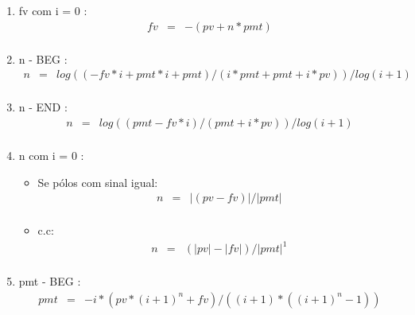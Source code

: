 \begin{enumerate}
\item fv com i = 0 \cite{arachnoid2}:
\begin{eqnarray*}
 fv &=& - (pv + n*pmt) \\
\end{eqnarray*}
 

\item  n - BEG \cite{arachnoid}:
\begin{eqnarray*}
 n &=& log( (-fv*i + pmt*i + pmt) / (i*pmt + pmt + i*pv) ) / log(i+1) \\
\end{eqnarray*} 


\item  n - END \cite{arachnoid}: 
\begin{eqnarray*}
 n &=& log( (pmt - fv*i) / (pmt + i*pv) ) / log(i+1) \\
\end{eqnarray*} 
  

\item  n com i = 0 \cite{arachnoid2}: 

\begin{itemize}
 \item Se pólos com sinal igual:
	\begin{eqnarray*}
 		 n &=& |(pv - fv)| / |pmt| \\ 		
	\end{eqnarray*}
  \item c.c:
	\begin{eqnarray*}
 		n &=& (|pv| - |fv|) / |pmt|   ^{1} \\	 
	\end{eqnarray*}
\end{itemize}
 

\item  pmt - BEG \cite{arachnoid}: 
\begin{eqnarray*}
	pmt &=& - i*( pv* ( i+1 )^{n} + fv ) / ( (i+1)*( (i+1)^{n} - 1 ) ) \\
\end{eqnarray*} 
 


\end{enumerate}
